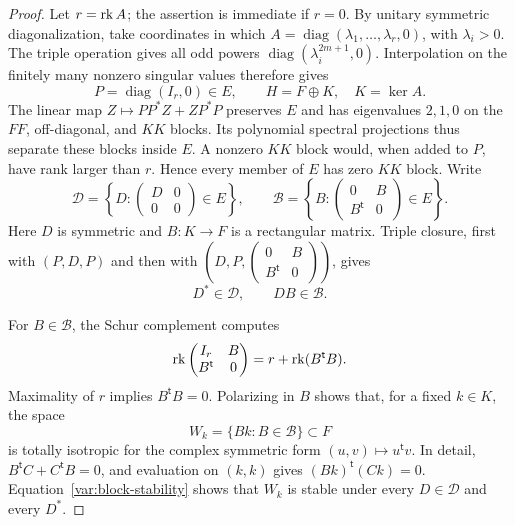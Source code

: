 \begin{proof}
Let $r=\operatorname{rk} A$; the assertion is immediate if $r=0$.  By unitary
symmetric diagonalization, take coordinates in which
$A=\operatorname{diag}(\lambda_1,\ldots,\lambda_r,0)$, with
$\lambda_i>0$.  The triple operation gives all odd powers
$\operatorname{diag}(\lambda_i^{2m+1},0)$.  Interpolation on the
finitely many nonzero singular values therefore gives
\[
          P=\operatorname{diag}(I_r,0)\in E,
          \qquad H=F\oplus K,\quad K=\ker A.
\]
The linear map $Z\mapsto PP^*Z+ZP^*P$ preserves $E$ and has
eigenvalues $2,1,0$ on the $FF$, off-diagonal, and $KK$ blocks.
Its polynomial spectral projections thus separate these blocks
inside $E$.  A nonzero $KK$ block would, when added to $P$, have rank
larger than $r$.  Hence every member of $E$ has zero $KK$ block.
Write
\[
 \mathcal D=\left\{D:
       \begin{pmatrix}D&0\\0&0\end{pmatrix}\in E\right\},\qquad
 \mathcal B=\left\{B:
       \begin{pmatrix}0&B\\B^{\mathsf t}&0\end{pmatrix}\in E\right\}.
\]
Here $D$ is symmetric and $B:K\to F$ is a rectangular matrix.
Triple closure, first with $(P,D,P)$ and then with
$(D,P,\left(\begin{smallmatrix}0&B\\B^{\mathsf t}&0\end{smallmatrix}\right))$,
gives
\begin{equation}
                 D^*\in\mathcal D,\qquad DB\in\mathcal B.
 \label{var:block-stability}
\end{equation}

For $B\in\mathcal B$, the Schur complement computes
\[
 \operatorname{rk}\begin{pmatrix}I_r&B\\B^{\mathsf t}&0\end{pmatrix}
                 =r+\operatorname{rk}(B^{\mathsf t}B).
\]
Maximality of $r$ implies $B^{\mathsf t}B=0$.  Polarizing in $B$
shows that, for a fixed $k\in K$, the space
\[
                W_k=\{Bk:B\in\mathcal B\}\subset F
\]
is totally isotropic for the complex symmetric form
$(u,v)\mapsto u^{\mathsf t}v$.  In detail,
$B^{\mathsf t}C+C^{\mathsf t}B=0$, and evaluation on $(k,k)$ gives
$(Bk)^{\mathsf t}(Ck)=0$.  Equation~\eqref{var:block-stability}
shows that $W_k$ is stable under every $D\in\mathcal D$ and every
$D^*$.


\end{proof}
